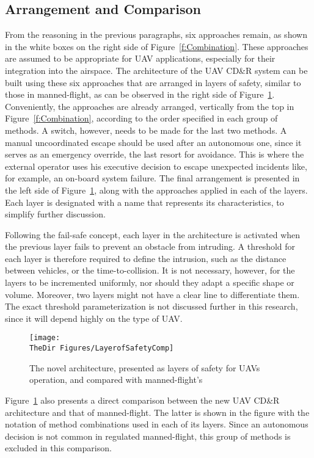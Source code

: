 \subsection{Arrangement and Comparison}
From the reasoning in the previous paragraphs, six approaches remain, as shown in the white boxes on the right side of Figure~\ref{f:Combination}. These approaches are assumed to be appropriate for UAV applications, especially for their integration into the airspace. The architecture of the UAV CD\&R system can be built using these six approaches that are arranged in layers of safety, similar to those in manned-flight, as can be observed in the right side of Figure~\ref{f:LayerofSafetyComp}. Conveniently, the approaches are already arranged, vertically from the top in Figure~\ref{f:Combination}, according to the order specified in each group of methods. A switch, however, needs to be made for the last two methods. A manual uncoordinated escape should be used after an autonomous one, since it serves as an emergency override, the last resort for avoidance. This is where the external operator uses his executive decision to escape unexpected incidents like, for example, an on-board system failure. The final arrangement is presented in the left side of Figure~\ref{f:LayerofSafetyComp}, along with the approaches applied in each of the layers. Each layer is designated with a name that represents its characteristics, to simplify further discussion.

Following the fail-safe concept, each layer in the architecture is activated when the previous layer fails to prevent an obstacle from intruding. A threshold for each layer is therefore required to define the intrusion, such as the distance between vehicles, or the time-to-collision\cite{barfield:00}. It is not necessary, however, for the layers to be incremented uniformly, nor should they adapt a specific shape or volume. Moreover, two layers might not have a clear line to differentiate them. The exact threshold parameterization is not discussed further in this research, since it will depend highly on the type of UAV. 

 \begin{figure}[h]
 	\centering
 	\texttt{[image: \\TheDir Figures/LayerofSafetyComp]}
 	\caption{The novel architecture, presented as layers of safety for UAVs operation, and compared with manned-flight's\cite{Dalamagkidis:09}}
 	\label{f:LayerofSafetyComp}
 \end{figure}
 
Figure~\ref{f:LayerofSafetyComp} also presents a direct comparison between the new UAV CD\&R architecture and that of manned-flight. The latter is shown in the figure with the notation of method combinations used in each of its layers. Since an autonomous decision is not common in regulated manned-flight, this group of methods is excluded in this comparison.

